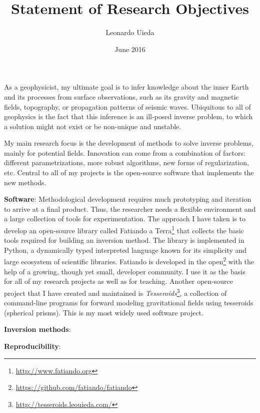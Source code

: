 \documentclass[12pt]{article}
\title{\textbf{Statement of Research Objectives}}
\author{Leonardo Uieda}
\date{June 2016}
\begin{document}
\maketitle


As a geophysicist,
my ultimate goal is
to infer knowledge about the inner Earth
and its processes
from surface observations,
such as its gravity and magnetic fields,
topography,
or propagation patterns of seismic waves.
%
Ubiquitous to all of geophysics
is the fact that this inference
is an ill-posed inverse problem,
to which a solution might not exist
or be non-unique and unstable.


My main research focus is
the development of methods
to solve inverse problems,
mainly for potential fields.
%
Innovation can come from
a combination of factors:
different parametrizations,
more robust algorithms,
new forms of regularization,
etc.
%
Central to all of my projects
is the open-source software
that implements the new methods.


\textbf{Software}:
Methodological development requires
much prototyping and iteration
to arrive at a final product.
%
Thus,
the researcher needs
a flexible environment
and a large collection of tools
for experimentation.
%
The approach I have taken is
to develop an open-source library
called Fatiando a Terra\footnote{\url{http://www.fatiando.org}}
that collects the basic tools
required for building an inversion method.
%
The library is implemented in Python,
a dynamically typed interpreted language
known for its simplicity
and large ecosystem of scientific libraries.
%
Fatiando is developed in the
open\footnote{\url{https://github.com/fatiando/fatiando}}
with the help of a growing, though yet small,
developer community.
%
I use it as the basis for
all of my research projects
as well as for teaching.
%
Another open-source project
that I have created and maintained
is \textit{Tesseroids}\footnote{\url{http://tesseroids.leouieda.com/}},
a collection of command-line programs
for forward modeling gravitational fields
using tesseroids (spherical prisms).
%
This is my most widely used software project.


\textbf{Inversion methods}:




\textbf{Reproducibility}:
\end{document}
